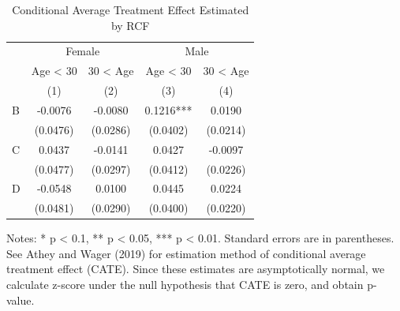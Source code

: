 \documentclass[
]{article}
\begin{document}
\begin{table}[H]

\caption{\label{tab:rcf-int-cate}Conditional Average Treatment Effect Estimated by RCF}
\centering
\fontsize{9}{11}\selectfont
\begin{threeparttable}
\begin{tabular}[t]{lcccc}
\toprule
\multicolumn{1}{c}{ } & \multicolumn{2}{c}{Female} & \multicolumn{2}{c}{Male} \\
\cmidrule(l{3pt}r{3pt}){2-3} \cmidrule(l{3pt}r{3pt}){4-5}
\multicolumn{1}{c}{ } & \multicolumn{1}{c}{Age < 30} & \multicolumn{1}{c}{30 < Age} & \multicolumn{1}{c}{Age < 30} & \multicolumn{1}{c}{30 < Age} \\
\cmidrule(l{3pt}r{3pt}){2-2} \cmidrule(l{3pt}r{3pt}){3-3} \cmidrule(l{3pt}r{3pt}){4-4} \cmidrule(l{3pt}r{3pt}){5-5}
 & (1) & (2) & (3) & (4)\\
\midrule
B & -0.0076 & -0.0080 & 0.1216*** & 0.0190\\
 & (0.0476) & (0.0286) & (0.0402) & (0.0214)\\
C & 0.0437 & -0.0141 & 0.0427 & -0.0097\\
 & (0.0477) & (0.0297) & (0.0412) & (0.0226)\\
D & -0.0548 & 0.0100 & 0.0445 & 0.0224\\
 & (0.0481) & (0.0290) & (0.0400) & (0.0220)\\
\bottomrule
\end{tabular}
\begin{tablenotes}
\item Notes: * p < 0.1, ** p < 0.05, *** p < 0.01. Standard errors are in parentheses. See Athey and Wager (2019) for estimation method of conditional average treatment effect (CATE). Since these estimates are asymptotically normal, we calculate z-score under the null hypothesis that CATE is zero, and obtain p-value. 
\end{tablenotes}
\end{threeparttable}
\end{table}
\end{document}
